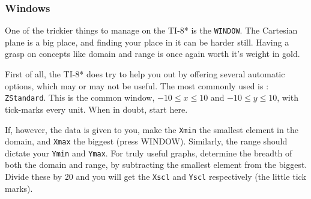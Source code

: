 
\subsubsection{Windows}
One of the trickier things to manage on the TI-8* is the \texttt{WINDOW}.  The Cartesian plane is 
a big place, and finding your place in it can be harder still.  Having a grasp
on concepts like \gls{domain} and \gls{range} is once again worth it's weight in gold.


First of all, the TI-8* does try to help you out by offering several automatic options, which 
may or may not be  useful.  The most commonly used is 
\Touche[style=graph,principal=zoom,position=0.9,raise=-5pt]
\Touche[style=number, principal=6,raise=-5pt]: \texttt{ZStandard}.  This is the common window, 
$-10\le x\le 10$ and $-10\le y\le 10$, with tick-marks every unit.  When in doubt, start here.

If, however, the data is given to you, make the \texttt{Xmin} the smallest element in the domain,
and \texttt{Xmax} the biggest (press WINDOW).  Similarly, the range should dictate your \texttt{Ymin} and 
\texttt{Ymax}.  For truly useful graphs, determine the breadth of both the domain and range, 
by subtracting the smallest element from the biggest.  Divide these by 20 and you will get
the \texttt{Xscl} and \texttt{Yscl} respectively (the little tick marks).

